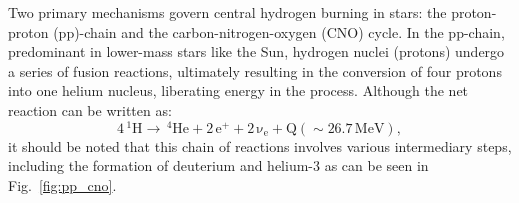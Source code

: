 \documentclass[main.tex]{subfiles}
\begin{document}
    Two primary mechanisms govern central hydrogen burning in stars: the proton-proton (pp)-chain and the carbon-nitrogen-oxygen (CNO) cycle. In the pp-chain, predominant in lower-mass stars like the Sun, hydrogen nuclei (protons) undergo a series of fusion reactions, ultimately resulting in the conversion of four protons into one helium nucleus, liberating energy in the process. Although the net reaction can be written as:
    \begin{equation}
        \label{eq:pp-chain}
        \mathrm{4\,^1H \longrightarrow \,^4He + 2\,e^+ + 2\,\nu_e + Q(\sim 26.7\,MeV)},
    \end{equation}
    it should be noted that this chain of reactions involves various intermediary steps, including the formation of deuterium and helium-3 as can be seen in Fig.~\ref{fig:pp_cno}.
\end{document}
